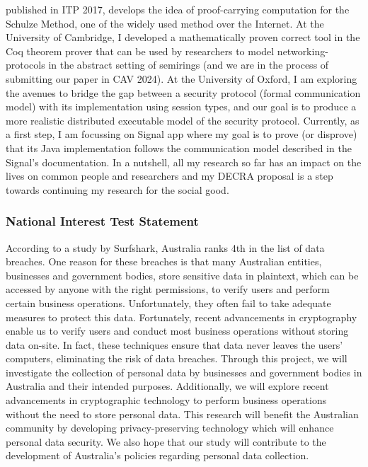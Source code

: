 \documentclass[12pt,a4paper]{article}
\begin{document}
published in ITP 2017, develops the idea of proof-carrying computation for 
the Schulze Method, one of the widely used method over the Internet. 
At the University of Cambridge, I developed a mathematically proven correct tool in 
the Coq theorem prover that can be used by researchers to model networking-protocols in the abstract
setting of semirings (and we are in the process of submitting our paper in CAV 2024).
At the University of Oxford, I am exploring the avenues to bridge the gap between a security protocol
(formal communication model) with its implementation using session types, and our
goal is to produce a more realistic distributed executable model of the security protocol.
Currently, as a first step, I am focussing on Signal app
where my goal is to prove (or disprove) that its Java implementation follows the
communication model described in the Signal's documentation.
In a nutshell, all my research so far has an impact on the lives on common people and
researchers and my DECRA proposal is a step towards continuing my research 
for the social good. 

\subsubsection*{National Interest Test Statement}
According to a study by Surfshark, Australia ranks 4th in the list of data breaches. 
One reason for these breaches is that many Australian entities, businesses 
and government bodies, store sensitive data in plaintext, which can be accessed by 
anyone with the right permissions, to verify users and perform certain business 
operations. Unfortunately, they often fail to take adequate measures to protect 
this data. Fortunately, recent advancements in cryptography enable us to verify 
users and conduct most business operations without storing data on-site. In fact, 
these techniques ensure that data never leaves the users' computers, eliminating the risk of data breaches. 
Through this project, we will investigate the collection of personal data by businesses 
and government bodies in Australia and their intended purposes. Additionally, we will 
explore recent advancements in cryptographic technology to perform business 
operations without the need to store personal data. 
This research will benefit the Australian community by developing privacy-preserving technology 
which will enhance personal data security. We also hope that our study will 
contribute to the development of Australia's policies regarding personal data collection.
\end{document}
